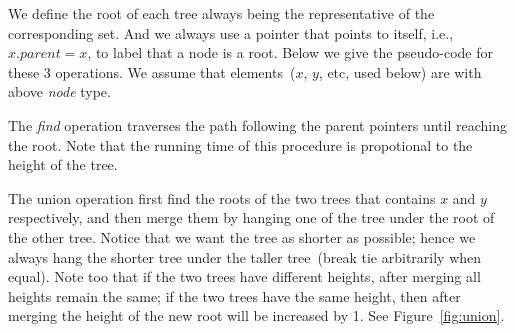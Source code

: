 \begin{minipage}{0.8\textwidth}
	\xxx
	\xxx
	\xxx
	\xxx
	\aaa {\};}\xxx
\end{minipage}

We define the root of each tree always being the representative of the corresponding set.
And we always use a pointer that points to itself, i.e., $x.parent = x$, to label
that a node is a root.
Below we give the pseudo-code for these 3 operations.
We assume that elements~($x$, $y$, etc, used below) are with above \emph{node} type.

\begin{minipage}{0.8\textwidth}
	\xxx
	\xxx
	\xxx
	\xxx
\end{minipage}

The \emph{find} operation traverses the path following the parent pointers 
until reaching the root. Note that the running time of this procedure
is propotional to the height of the tree.

\begin{minipage}{0.8\textwidth}
	\xxx
	\xxx
	\xxx
	\xxx
	\xxx
	\xxx
\end{minipage}

The union operation first find the roots of the two trees that contains $x$ and
$y$ respectively, and then merge them by hanging one of the tree under the root
of the other tree. Notice that we want the tree as shorter as possible;
hence we always hang the shorter tree under the taller tree~(break tie arbitrarily when equal).
Note too that if the two trees have different heights,
after merging all heights remain the same;
if the two trees have the same height, then after merging
the height of the new root will be increased by 1.
See Figure~\ref{fig:union}.

\begin{minipage}{0.8\textwidth}
	\xxx
	\xxx
	\xxx
	\xxx
	\xxx
	\xxx
	\xxx
	\xxx
	\xxx
	\xxx
	\xxx
	\xxx
	\xxx
\end{minipage}


